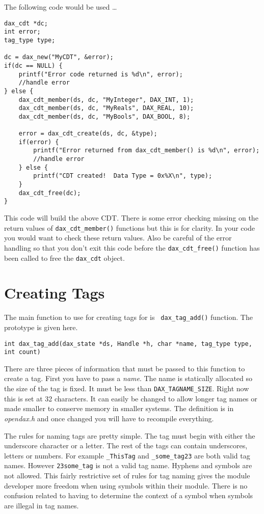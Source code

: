 The following code would be used \ldots

\begin{verbatim}
dax_cdt *dc;
int error;
tag_type type;

dc = dax_new("MyCDT", &error);
if(dc == NULL) {
    printf("Error code returned is %d\n", error);
    //handle error
} else {
    dax_cdt_member(ds, dc, "MyInteger", DAX_INT, 1);
    dax_cdt_member(ds, dc, "MyReals", DAX_REAL, 10);
    dax_cdt_member(ds, dc, "MyBools", DAX_BOOL, 8);

    error = dax_cdt_create(ds, dc, &type);
    if(error) {
        printf("Error returned from dax_cdt_member() is %d\n", error);
	    //handle error
    } else {
        printf("CDT created!  Data Type = 0x%X\n", type);
    }
    dax_cdt_free(dc);
}

\end{verbatim}

This code will build the above CDT.  There is some error checking missing on the return values of \verb|dax_cdt_member()| functions but this is for clarity.  In your code you would want to check these return values.  Also be careful of the error handling so that you don't exit this code before the \verb|dax_cdt_free()| function has been called to free the \verb|dax_cdt| object.



\section{Creating Tags}
The main function to use for creating tags for \opendax is \verb| dax_tag_add()| function.  The prototype is given here.

\verb|int dax_tag_add(dax_state *ds, Handle *h, char *name, tag_type type, int count)|

There are three pieces of information that must be passed to this function to create a tag.  First you have to pass a \emph{name}.  The name is statically allocated so the size of the tag is fixed.  It must be less than \verb|DAX_TAGNAME_SIZE|.  Right now this is set at 32 characters.  It can easily be changed to allow longer tag names or made smaller to conserve memory in smaller systems.  The definition is in \emph{opendax.h} and once changed you will have to recompile everything.

The rules for naming tags are pretty simple.  The tag must begin with either the underscore character or a letter.  The rest of the tags can contain underscores, letters or numbers.  For example \verb|_ThisTag| and \verb|_some_tag23| are both valid tag names.  However \verb|23some_tag| is not a valid tag name.  Hyphens and symbols are not allowed.  This fairly restrictive set of rules for tag naming gives the module developer more freedom when using symbols within their module.  There is no confusion related to having to determine the context of a symbol when symbols are illegal in tag names.

